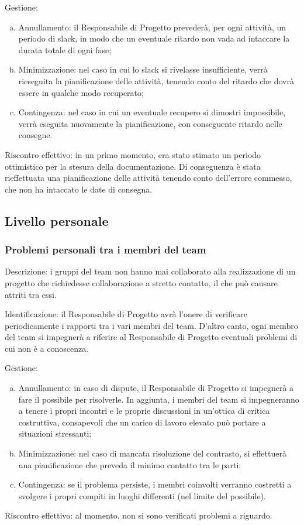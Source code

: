 \documentclass[../PianoProgetto.tex]{subfiles}
\begin{document}
	Gestione:
	\begin{enumerate}[(a)]
		\item Annullamento: il Responsabile di Progetto prevederà, per ogni attività, un periodo di slack, in modo che un eventuale ritardo non vada ad intaccare la durata totale di ogni fase;
		\item Minimizzazione: nel caso in cui lo slack si rivelasse insufficiente, verrà rieseguita la pianificazione delle attività, tenendo conto del ritardo che dovrà essere in qualche modo recuperato;
		\item Contingenza: nel caso in cui un eventuale recupero si dimostri impossibile, verrà eseguita nuovamente la pianificazione, con conseguente ritardo nelle consegne.
	\end{enumerate}	
	Riscontro effettivo: in un primo momento, era stato stimato un periodo ottimistico per la stesura della documentazione. Di conseguenza è stata rieffettuata una pianificazione delle attività tenendo conto dell’errore commesso, che non ha intaccato le date di consegna.


\subsection{Livello personale}

\subsubsection{Problemi personali tra i membri del team}
	Descrizione: i gruppi del team non hanno mai collaborato alla realizzazione di un progetto che richiedesse collaborazione a stretto contatto, il che può causare attriti tra essi.
	
	Identificazione: il Responsabile di Progetto avrà l’onere di verificare periodicamente i rapporti tra i vari membri del team. D’altro canto, ogni membro del team si impegnerà a riferire al Responsabile di Progetto eventuali problemi di cui non è a conoscenza.
	
	Gestione:
	\begin{enumerate}[(a)]
		\item Annullamento: in caso di dispute, il Responsabile di Progetto si impegnerà a fare il possibile per risolverle. In aggiunta, i membri del team si impegneranno a tenere i propri incontri e le proprie discussioni in un’ottica di critica costruttiva, consapevoli che un carico di lavoro elevato può portare a situazioni stressanti;
		\item Minimizzazione: nel caso di mancata risoluzione del contrasto, si effettuerà una pianificazione che preveda il minimo contatto tra le parti; 
		\item Contingenza: se il problema persiste, i membri coinvolti verranno costretti a svolgere i propri compiti in luoghi differenti (nel limite del possibile).
	\end{enumerate}	
	Riscontro effettivo: al momento, non si sono verificati problemi a riguardo.
\end{document}
